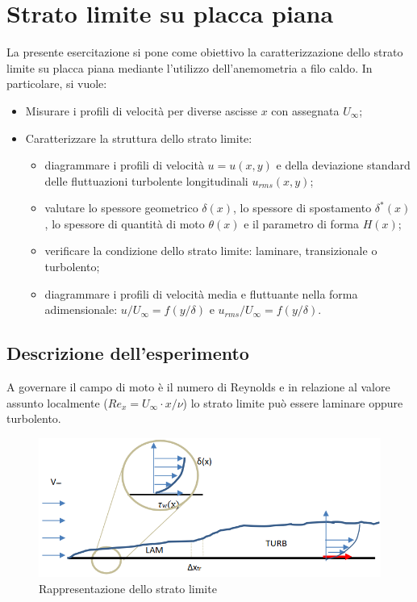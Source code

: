 \section{Strato limite su placca piana}\label{c9}
La presente esercitazione si pone come obiettivo la caratterizzazione dello strato limite su placca piana mediante l'utilizzo dell'anemometria a filo caldo. In particolare, si vuole:
\begin{itemize}
    \item Misurare i profili di velocità per diverse ascisse $x$ con assegnata $U_\infty$;
    \item Caratterizzare la struttura dello strato limite:
    \begin{itemize}
        \item diagrammare i profili di velocità $u=u(x,y)$ e della deviazione standard delle fluttuazioni turbolente longitudinali $u_{rms}(x,y)$;
        \item valutare lo spessore geometrico $\delta(x)$, lo spessore di spostamento $\delta^*(x)$, lo spessore di quantità di moto $\theta(x)$ e il parametro di forma $H(x)$;
        \item verificare la condizione dello strato limite: laminare, transizionale o turbolento;
        \item diagrammare i profili di velocità media e fluttuante nella forma adimensionale: $u/U_\infty = f(y/\delta)$ e $u_{rms}/U_\infty = f(y/\delta)$.
    \end{itemize}
\end{itemize}

\subsection{Descrizione dell'esperimento}
A governare il campo di moto è il numero di Reynolds e in relazione al valore assunto localmente ($Re_{x}=U_\infty\cdot x/\nu$) lo strato limite può essere laminare oppure turbolento.
\begin{figure}[H]
    \centering
    \includegraphics[width=.8\textwidth]{images/9/slimage.png}
    \caption{Rappresentazione dello strato limite}
\end{figure}

